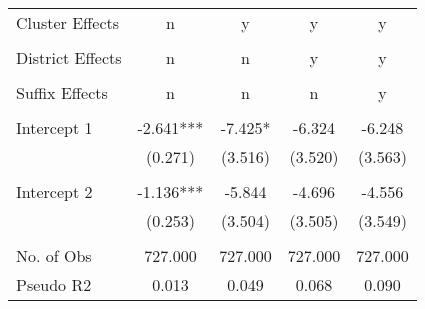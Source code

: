 \begin{tabular}{lcccc}
  Cluster Effects &                                 n &                                 y &                                 y &                                 y \\
                  &                                   &                                   &                                   &                                   \\
 District Effects &                                 n &                                 n &                                 y &                                 y \\
                  &                                   &                                   &                                   &                                   \\
   Suffix Effects &                                 n &                                 n &                                 n &                                 y \\
                  &                                   &                                   &                                   &                                   \\
      Intercept 1 &                         -2.641*** &                           -7.425* &                            -6.324 &                            -6.248 \\
                  &                           (0.271) &                           (3.516) &                           (3.520) &                           (3.563) \\
                  &                                   &                                   &                                   &                                   \\
      Intercept 2 &                         -1.136*** &                            -5.844 &                            -4.696 &                            -4.556 \\
                  &                           (0.253) &                           (3.504) &                           (3.505) &                           (3.549) \\
                  &                                   &                                   &                                   &                                   \\
       No. of Obs &                           727.000 &                           727.000 &                           727.000 &                           727.000 \\
        Pseudo R2 &                             0.013 &                             0.049 &                             0.068 &                             0.090 \\
\bottomrule
\end{tabular}

